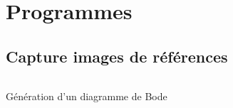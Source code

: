 \documentclass[
    iai, %
    eai, %
]{heig-tb}
\begin{document}
\chapter{Programmes}
\section{Capture images de références}
\begin{listing}[h]
    \inputminted{python}{assets/code/cap_img_ref.py}
    \caption{Génération d'un diagramme de Bode \label{python}}
\end{listing}

\let\cleardoublepage\clearpage
\backmatter

\label{glossaire}
\printnoidxglossary
\label{index}
\printindex

%
\end{document}
